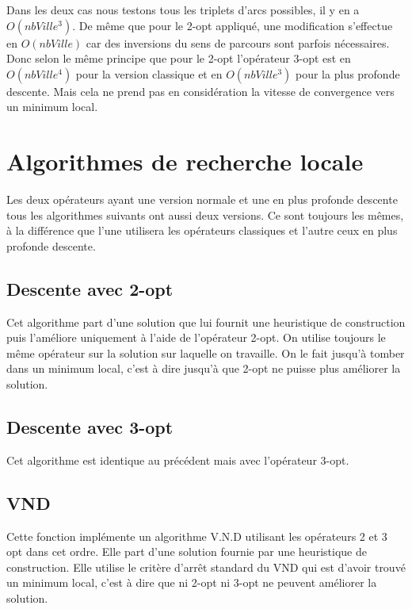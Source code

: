 \documentclass[12pt,a4paper]{article}
\begin{document}
Dans les deux cas nous testons tous les triplets d'arcs possibles, il y en a $O(nbVille ^3)$. De même que pour le 2-opt appliqué, une modification s'effectue en $O(nbVille)$ car des inversions du sens de parcours sont parfois nécessaires. Donc selon le même principe que pour le 2-opt l'opérateur 3-opt est en $O(nbVille^4)$ pour la version classique et en $O(nbVille^3)$ pour la plus profonde descente. Mais cela ne prend pas en considération la vitesse de convergence vers un minimum local.\\

\section{Algorithmes de recherche locale}

Les deux opérateurs ayant une version normale et une en plus profonde descente tous les algorithmes suivants ont aussi deux versions. Ce sont toujours les mêmes, à la différence que l'une utilisera les opérateurs classiques et l'autre ceux en plus profonde descente.

\subsection{Descente avec 2-opt}

Cet algorithme part d'une solution que lui fournit une heuristique de construction puis l’améliore uniquement à l'aide de l'opérateur 2-opt. On utilise toujours le même opérateur sur la solution sur laquelle on travaille. On le fait jusqu’à tomber dans un minimum local, c'est à dire jusqu’à que 2-opt ne puisse plus améliorer la solution.

\subsection{Descente avec 3-opt}

Cet algorithme est identique au précédent mais avec l'opérateur 3-opt.

\subsection{VND}

Cette fonction implémente un algorithme V.N.D utilisant les opérateurs 2 et 3 opt dans cet ordre. Elle part d'une solution fournie par une heuristique de construction. Elle utilise le critère d’arrêt standard du VND qui est d'avoir trouvé un minimum local, c'est à dire que ni 2-opt ni 3-opt ne peuvent améliorer la solution.
\end{document}
